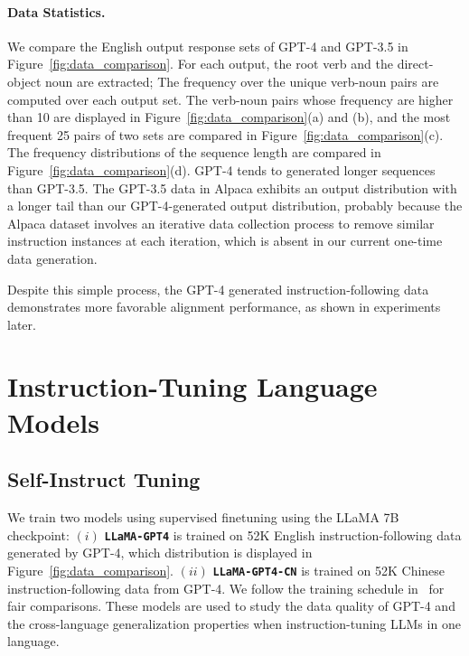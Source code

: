 \paragraph{Data Statistics.} We compare the English output response sets of GPT-4 and GPT-3.5 in Figure~\ref{fig:data_comparison}. For each output, the root verb and the direct-object noun are extracted; The frequency over the unique verb-noun pairs are computed over each output set. The verb-noun pairs whose frequency are higher than 10 are displayed in Figure~\ref{fig:data_comparison}(a) and (b), and the most frequent 25 pairs of two sets are compared in Figure~\ref{fig:data_comparison}(c).
The frequency distributions of the sequence length are compared in Figure~\ref{fig:data_comparison}(d). GPT-4 tends to generated longer sequences than GPT-3.5. The GPT-3.5 data in Alpaca exhibits an output distribution with a longer tail than our GPT-4-generated output distribution, probably because the Alpaca dataset involves an iterative data collection process to remove similar instruction instances at each iteration, which is absent in our current one-time data generation. 

Despite this simple process, the GPT-4 generated instruction-following data demonstrates more favorable alignment performance, as shown in experiments later.

\section{Instruction-Tuning Language Models}

\subsection{Self-Instruct Tuning}

We train two models using supervised finetuning using the LLaMA 7B checkpoint: $(i)$ \texttt{\bfseries LLaMA-GPT4} is trained on 52K English instruction-following data generated by GPT-4, which distribution is displayed in Figure~\ref{fig:data_comparison}.
$(ii)$  \texttt{\bfseries LLaMA-GPT4-CN} is trained on 52K Chinese instruction-following data from GPT-4. We follow the training schedule in~\citep{alpaca} for fair comparisons. These models are used to study the data quality of GPT-4 and the cross-language generalization properties when instruction-tuning LLMs in one language.

